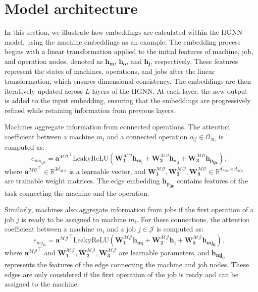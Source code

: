 \section{Model architecture}
\label{appendix:arquitecture}

In this section, we illustrate how embeddings are calculated within the HGNN model, using the machine embeddings as an example. The embedding process begins with a linear transformation applied to the initial features of machine, job, and operation nodes, denoted as $\boldsymbol{h_m}$, $\boldsymbol{h_o}$, and $\boldsymbol{h_j}$, respectively. These features represent the states of machines, operations, and jobs after the linear transformation, which ensures dimensional consistency. The embeddings are then iteratively updated across $L$ layers of the HGNN. At each layer, the new output is added to the input embedding, ensuring that the embeddings are progressively refined while retaining information from previous layers.

Machines aggregate information from connected operations. The attention coefficient between a machine $m_i$ and a connected operation $o_{ij} \in \mathcal{O}_{m_i}$ is computed as:
\begin{equation}
e_{mo_{ijk}} = {\boldsymbol{a^{\mathcal{MO}}}}^{\top} \text{LeakyReLU} \left( \boldsymbol{W_1^\mathcal{MO}} \boldsymbol{h_{m_i}} + \boldsymbol{W_2^\mathcal{MO}} \boldsymbol{h_{o_{ij}}} + \boldsymbol{W_3^\mathcal{MO}} \boldsymbol{h_{p_{ijk}}} \right),
\end{equation}
where ${\boldsymbol{a^{\mathcal{MO}}}}^{\top} \in \mathbb{R}^{3d_{\mathcal{MO}}^\prime}$ is a learnable vector, and $\boldsymbol{W_1^\mathcal{MO}}, \boldsymbol{W_2^\mathcal{MO}}, \boldsymbol{W_3^\mathcal{MO}} \in \mathbb{R}^{d_{\mathcal{MO}}^\prime \times d_{\mathcal{MO}}}$ are trainable weight matrices. The edge embedding $\boldsymbol{h_{p_{ijk}}}$ contains features of the task connecting the machine and the operation.

Similarly, machines also aggregate information from jobs if the first operation of a job $j$ is ready to be assigned to machine $m_i$. For these connections, the attention coefficient between a machine $m_i$ and a job $j \in \mathcal{J}$ is computed as:
\begin{equation}
e_{mj_{ik}} = {\boldsymbol{a^{\mathcal{MJ}}}}^{\top} \text{LeakyReLU} \left( \boldsymbol{W_1^\mathcal{MJ}} \boldsymbol{h_{m_i}} + \boldsymbol{W_2^\mathcal{MJ}} \boldsymbol{h_{j}} + \boldsymbol{W_3^\mathcal{MJ}} \boldsymbol{h_{mj_{ij}}} \right),
\end{equation}
where ${\boldsymbol{a^{\mathcal{MJ}}}}^{\top}$ and $\boldsymbol{W_1^\mathcal{MJ}}, \boldsymbol{W_2^\mathcal{MJ}}, \boldsymbol{W_3^\mathcal{MJ}}$ are learnable parameters, and $\boldsymbol{h_{mj_{ij}}}$ represents the features of the edge connecting the machine and job nodes. These edges are only considered if the first operation of the job is ready and can be assigned to the machine.

